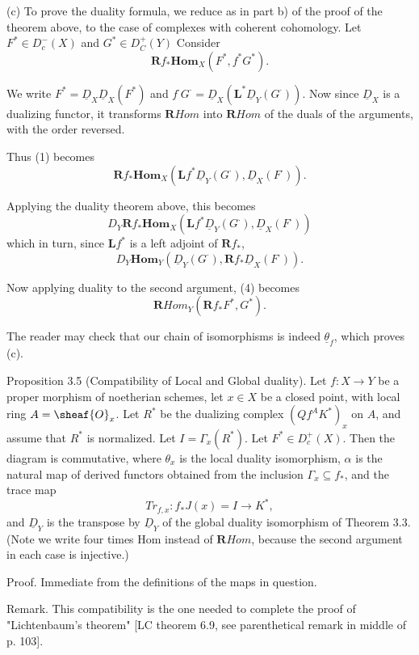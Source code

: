 \documentclass[12pt]{book}
\begin{document}
(c) To prove the duality formula, we reduce as in part b) of the proof of the theorem above, to the case of complexes with coherent cohomology.
Let \(F^{*} \in D_{c}^{-}(X)\) and \(G^{*} \in D_{C}^{+}(Y)\) Consider
\[\mathbf{R} f_{*} \mathbf{Hom}_{X}\left(F^{*}, f^{*} G^{*}\right) . \tag{1}\]

We write \(F^{*}=\underline{D}_{X} \underline{D}_{X}(F^{*})\) and \(f^{\cdot} G^{\cdot}=\underline{D}_{X}(\mathbf{L}^{*} \underline{D}_{Y}(G^{\cdot}))\).
Now since \(\underline{D}_{X}\) is a dualizing functor, it transforms \(\mathbf{R}Hom\) into \(\mathbf{R}Hom\) of the duals of the arguments, with the order reversed.

\setcounter{page}{386}
Thus (1) becomes
\[\mathbf{R} f_{*} \mathbf{Hom}_{X}\left(\mathbf{L} f^{*} \underline{D}_{Y}\left(G^{\cdot}\right), \underline{D}_{X}\left(F^{\cdot}\right)\right) . \tag{2}\]

Applying the duality theorem above, this becomes
\[D_{Y} \mathbf{R} f_{*} \mathbf{Hom}_{X}\left(\mathbf{L} f^{*} \underline{D}_{Y}\left(G^{\cdot}\right), \underline{D}_{X}\left(F^{\cdot}\right)\right) \tag{3}\]
which in turn, since \(\mathbf{L} f^{*}\) is a left adjoint of \(\mathbf{R} f_{*}\),
\[D_{Y} \mathbf{Hom}_{Y}\left(\underline{D}_{Y}\left(G^{\cdot}\right), \mathbf{R} f_{*} \underline{D}_{X}\left(F^{\cdot}\right)\right) . \tag{4}\]

Now applying duality to the second argument, (4) becomes
\[\mathbf{R}Hom_{Y}\left(\mathbf{R} f_{*} F^{*}, G^{*}\right) .\]

The reader may check that our chain of isomorphisms is indeed \(\underline{\theta}_{f}\), which proves (c).

\setcounter{page}{387}
Proposition 3.5 (Compatibility of Local and Global duality). Let \(f: X \to Y\) be a proper morphism of noetherian schemes,
let \(x \in X\) be a closed point, with local ring \(A=\sheaf{O}_{x}\).
Let \(R^{*}\) be the dualizing complex \((Qf^{A} K^{*})_{x}\) on \(A\), and assume that \(R^{*}\) is normalized.
Let \(I=\Gamma_{x}(R^{*})\).
Let \(F^{*} \in D_{c}^{+}(X)\).
Then the diagram
is commutative, where \(\theta_{x}\) is the local duality isomorphism, \(\alpha\) is the natural map of derived functors obtained from the inclusion \(\Gamma_{x} \subseteq f_{*}\),
and the trace map
\[Tr_{f, x}: f_{*} J(x)=I \to K^{*},\]
and \(\underline{D}_{Y}\) is the transpose by \(\underline{D}_{Y}\) of the global duality isomorphism of Theorem 3.3.
(Note we write four times Hom instead of \(\mathbf{R}Hom\), because the second argument in each case is injective.)

Proof. Immediate from the definitions of the maps in question.

Remark. This compatibility is the one needed to complete the proof of "Lichtenbaum's theorem" [LC theorem 6.9, see parenthetical remark in middle of p. 103].
\end{document}
